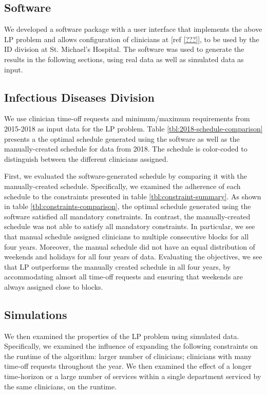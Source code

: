 \subsection{Software}
We developed a software package with a user interface that implements the above LP problem and allows configuration of clinicians at [ref \ref{???}], to be used by the ID division at St. Michael's Hospital. The software was used to generate the results in the following sections, using real data as well as simulated data as input.

\subsection{Infectious Diseases Division}  %
We use clinician time-off requests and minimum/maximum requirements from 2015-2018 as input data for the LP problem. Table \ref{tbl:2018-schedule-comparison} presents a the optimal schedule generated using the software as well as the manually-created schedule for data from 2018. The schedule is color-coded to distinguish between the different clinicians assigned.


First, we evaluated the software-generated schedule by comparing it with the manually-created schedule. Specifically, we examined the adherence of each schedule to the constraints presented in table \ref{tbl:constraint-summary}. As shown in table \ref{tbl:constraints-comparison}, the optimal schedule generated using the software satisfied all mandatory constraints. In contrast, the manually-created schedule was not able to satisfy all mandatory constraints. In particular, we see that manual schedule assigned clinicians to multiple consecutive blocks for all four years. Moreover, the manual schedule did not have an equal distribution of weekends and holidays for all four years of data. Evaluating the objectives, we see that LP outperforms the manually created schedule in all four years, by accommodating almost all time-off requests and ensuring that weekends are always assigned close to blocks.



\subsection{Simulations}
We then examined the properties of the LP problem using simulated data. Specifically, we examined the influence of expanding the following constraints on the runtime of the algorithm: larger number of  clinicians; clinicians with many time-off requests throughout the year. We then examined the effect of a longer time-horizon or a large number of services within a single department serviced by the same clinicians, on the runtime. \\

